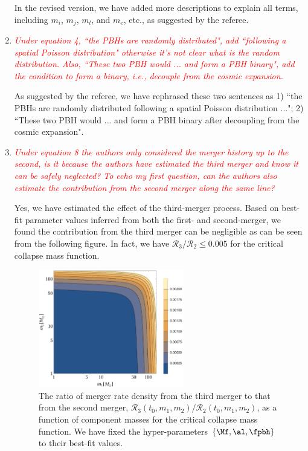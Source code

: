 \documentclass[
preprint,          %
superscriptaddress,%
amsmath,           %
amssymb,           %
aps,               %
prl,               %
notitlepage,       %
longbibliography,  %
floatfix,          %
nofootinbib,
onecolumn,
]{revtex4-1}
\newcommand{\red}[1]{\textcolor{red}{#1}}
\newcommand{\cR}{\mathcal{R}}
\begin{document}
\begin{enumerate}
In the revised version, we have added more descriptions to explain all terms, including $m_i$, $m_j$, $m_l$, and $m_e$, etc., as suggested by the referee.

\item \red{\it Under equation 4, ``the PBHs are randomly distributed", add ``following a spatial Poisson distribution" otherwise it's not clear what is the random distribution. Also, ``These two PBH would ... and form a PBH binary", add the condition to form a binary, i.e., decouple from the cosmic expansion.}

As suggested by the referee, we have rephrased these two sentences as 1) ``the PBHs are randomly distributed following a spatial Poisson distribution ..."; 2) ``These two PBH would ... and form a PBH binary after decoupling from the cosmic expansion".

\item \red{\it Under equation 8 the authors only considered the merger history up to the second, is it because the authors have estimated the third merger and know it can be safely neglected? To echo my first question, can the authors also estimate the contribution from the second merger along the same line?}

Yes, we have estimated the effect of the third-merger process. Based on best-fit parameter values inferred from both the first- and second-merger, we found the contribution from the third merger can be negligible as can be seen from the following figure. In fact, we have $\cR_3/\cR_2 \leq 0.005$ for the critical collapse mass function.

\begin{figure}[hp!]
	\centering
	\includegraphics[width=0.6\textwidth]{ratio-CC-32.pdf}
	\caption{\label{ratio-power}The ratio of merger rate density from the third merger to that from the second merger, $\cR_3(t_0, m_1, m_2)/\cR_2(t_0, m_1, m_2)$, as a function of component masses for the critical collapse mass function. We have fixed the hyper-parameters $\{\Mf, \al, \fpbh\}$ to their best-fit values.}
\end{figure}


\end{enumerate}
\end{document}
